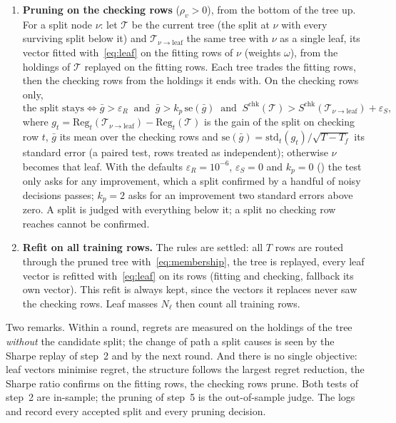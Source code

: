 \documentclass[11pt,a4paper]{article}
\newcommand{\code}[1]{\texttt{\detokenize{#1}}}
\newcommand{\1}{\mathbf{1}}
\newcommand{\Reg}{\mathrm{Reg}}
\begin{document}
\begin{enumerate}
\item[5.] \textbf{Pruning on the checking rows} ($\rho_v>0$), from the bottom of the tree up. For a split node $\nu$: let $\mathcal T$ be the current tree (the split at $\nu$ with every surviving split below it) and $\mathcal T_{\nu\to\mathrm{leaf}}$ the same tree with $\nu$ as a single leaf, its vector fitted with~\eqref{eq:leaf} on the fitting rows of $\nu$ (weights $\omega$), from the holdings of $\mathcal T$ replayed on the fitting rows. Each tree trades the fitting rows, then the checking rows from the holdings it ends with. On the checking rows only,
\begin{equation}\label{eq:prune}
\text{the split stays}\iff \bar g>\varepsilon_R\ \text{ and }\ \bar g>k_p\,\mathrm{se}(\bar g)\ \text{ and }\ S^{\mathrm{chk}}(\mathcal T)>S^{\mathrm{chk}}(\mathcal T_{\nu\to\mathrm{leaf}})+\varepsilon_S ,
\end{equation}
where $g_t=\Reg_t(\mathcal T_{\nu\to\mathrm{leaf}})-\Reg_t(\mathcal T)$ is the gain of the split on checking row $t$, $\bar g$ its mean over the checking rows and $\mathrm{se}(\bar g)=\mathrm{std}_t(g_t)/\sqrt{T-T_f}$ its standard error (a paired test, rows treated as independent); otherwise $\nu$ becomes that leaf. With the defaults $\varepsilon_R=10^{-6}$, $\varepsilon_S=0$ and $k_p=0$ (\code{prune_standard_errors}) the test only asks for any improvement, which a split confirmed by a handful of noisy decisions passes; $k_p=2$ asks for an improvement two standard errors above zero. A split is judged with everything below it; a split no checking row reaches cannot be confirmed.
\item[6.] \textbf{Refit on all training rows.} The rules are settled: all $T$ rows are routed through the pruned tree with~\eqref{eq:membership}, the tree is replayed, every leaf vector is refitted with~\eqref{eq:leaf} on its rows (fitting and checking, fallback its own vector). This refit is always kept, since the vectors it replaces never saw the checking rows. Leaf masses $N_\ell$ then count all training rows.
\end{enumerate}

Two remarks. Within a round, regrets are measured on the holdings of the tree \emph{without} the candidate split; the change of path a split causes is seen by the Sharpe replay of step~2 and by the next round. And there is no single objective: leaf vectors minimise regret, the structure follows the largest regret reduction, the Sharpe ratio confirms on the fitting rows, the checking rows prune. Both tests of step~2 are in-sample; the pruning of step~5 is the out-of-sample judge. The logs \code{growth_log} and \code{pruning_log} record every accepted split and every pruning decision.
\end{document}
